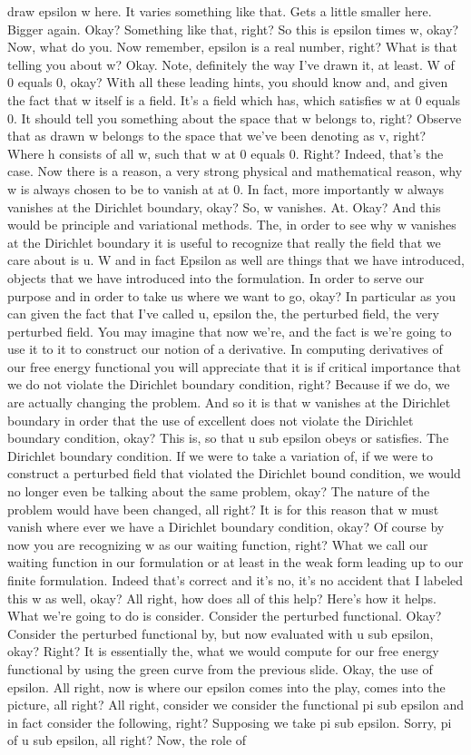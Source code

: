 \documentclass[10pt]{article}
\begin{document}
{draw epsilon w here. It varies something like that. Gets a little smaller here. Bigger again. Okay? Something like that, right? So this is epsilon times w, okay? Now, what do you. Now remember, epsilon is a real number, right? What is that telling you about w? Okay. Note, definitely the way I've drawn it, at least. W of 0 equals 0, okay? With all these leading hints, you should know and, and given the fact that w itself is a field. It's a field which has, which satisfies w at 0 equals 0. It should tell you something about the space that w belongs to, right? Observe that as drawn w belongs to the space that we've been denoting as v, right? Where h consists of all w, such that w at 0 equals 0. Right? Indeed, that's the case. Now there is a reason, a very strong physical and mathematical reason, why w is always chosen to be to vanish at at 0. In fact, more importantly w always vanishes at the Dirichlet boundary, okay? So, w vanishes. At. Okay? And this would be principle and variational methods. The, in order to see why w vanishes at the Dirichlet boundary it is useful to recognize that really the field that we care about is u. W and in fact Epsilon as well are things that we have introduced, objects that we have introduced into the formulation. In order to serve our purpose and in order to take us where we want to go, okay? In particular as you can given the fact that I've called u, epsilon the, the perturbed field, the very perturbed field. You may imagine that now we're, and the fact is we're going to use it to it to construct our notion of a derivative. In computing derivatives of our free energy functional you will appreciate that it is if critical importance that we do not violate the Dirichlet boundary condition, right? Because if we do, we are actually changing the problem. And so it is that w vanishes at the Dirichlet boundary in order that the use of excellent does not violate the Dirichlet boundary condition, okay? This is, so that u sub epsilon obeys or satisfies. The Dirichlet boundary condition. If we were to take a variation of, if we were to construct a perturbed field that violated the Dirichlet bound condition, we would no longer even be talking about the same problem, okay? The nature of the problem would have been changed, all right? It is for this reason that w must vanish where ever we have a Dirichlet boundary condition, okay? Of course by now you are recognizing w as our waiting function, right? What we call our waiting function in our formulation or at least in the weak form leading up to our finite formulation. Indeed that's correct and it's no, it's no accident that I labeled this w as well, okay? All right, how does all of this help? Here's how it helps. What we're going to do is consider. Consider the perturbed functional. Okay? Consider the perturbed functional by, but now evaluated with u sub epsilon, okay? Right? It is essentially the, what we would compute for our free energy functional by using the green curve from the previous slide. Okay, the use of epsilon. All right, now is where our epsilon comes into the play, comes into the picture, all right? All right, consider we consider the functional pi sub epsilon and in fact consider the following, right? Supposing we take pi sub epsilon. Sorry, pi of u sub epsilon, all right? Now, the role of }
\end{document}
